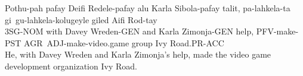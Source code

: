 \begin{exe}
    \ex{} \gll{}Pothu-pah pafay Deifi Redele-pafay alu Karla Sibola-pafay talit, pa-lahkela-ta gi~gu-lahkela-kolugeyle giled Aifi Rod-tay\\
                3SG-NOM with Davey Wreden-GEN and Karla Zimonja-GEN help, PFV-make-PST AGR~ADJ-make-video.game group Ivy Road.PR-ACC\\
          \glt{}He, with Davey Wreden and Karla Zimonja's help, made the video game development organization Ivy Road.
\end{exe}

